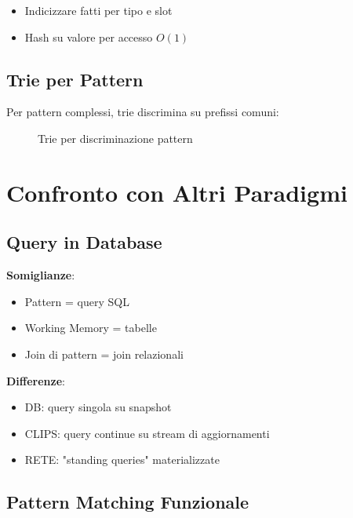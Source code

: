 \begin{itemize}
\item Indicizzare fatti per tipo e slot
\item Hash su valore per accesso $O(1)$
\end{itemize}

\subsection{Trie per Pattern}

Per pattern complessi, trie discrimina su prefissi comuni:

\begin{figure}[h]
\centering
{}
\caption{Trie per discriminazione pattern}
\end{figure}

\section{Confronto con Altri Paradigmi}

\subsection{Query in Database}

\textbf{Somiglianze}:
\begin{itemize}
\item Pattern = query SQL
\item Working Memory = tabelle
\item Join di pattern = join relazionali
\end{itemize}

\textbf{Differenze}:
\begin{itemize}
\item DB: query singola su snapshot
\item CLIPS: query continue su stream di aggiornamenti
\item RETE: "standing queries" materializzate
\end{itemize}

\subsection{Pattern Matching Funzionale}

